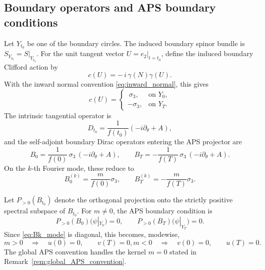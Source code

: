 \documentclass[11pt]{article}
\theoremstyle{definition}
\numberwithin{equation}{section}
\begin{document}
\subsection{Boundary operators and APS boundary conditions}

Let \(Y_{t_0}\) be one of the boundary circles. The induced boundary spinor bundle is \(S_{Y_{t_0}}=S|_{Y_{t_0}}\).
For the unit tangent vector \(U=e_2|_{t=t_0}\), define the induced boundary Clifford action by
\begin{equation}\label{eq:boundary_clifford}
c(U)=-\,i\,\gamma(N)\gamma(U).
\end{equation}
With the inward normal convention \eqref{eq:inward_normal}, this gives
\begin{equation}\label{eq:cU_formula}
c(U)=
\begin{cases}
\ \sigma_3,& \text{on }Y_0,\\
-\sigma_3,& \text{on }Y_T.
\end{cases}
\end{equation}
The intrinsic tangential operator is
\begin{equation}\label{eq:Dt0}
D_{t_0}
=
\frac{1}{f(t_0)}(-i\partial_\theta+A),
\end{equation}
and the self-adjoint boundary Dirac operators entering the APS projector are
\begin{equation}\label{eq:B0BT}
B_0=\frac{1}{f(0)}\,\sigma_3\,(-i\partial_\theta+A),
\qquad
B_T=-\frac{1}{f(T)}\,\sigma_3\,(-i\partial_\theta+A).
\end{equation}
On the \(k\)-th Fourier mode, these reduce to
\begin{equation}\label{eq:Bk_mode}
B_0^{(k)}=\frac{m}{f(0)}\sigma_3,
\qquad
B_T^{(k)}=-\frac{m}{f(T)}\sigma_3.
\end{equation}

Let \(P_{>0}(B_{t_0})\) denote the orthogonal projection onto the strictly positive spectral subspace of \(B_{t_0}\). For \(m\neq 0\), the APS boundary condition is
\begin{equation}\label{eq:APSabstract}
P_{>0}(B_0)\bigl(\psi|_{Y_0}\bigr)=0,
\qquad
P_{>0}(B_T)\bigl(\psi|_{Y_T}\bigr)=0.
\end{equation}
Since \eqref{eq:Bk_mode} is diagonal, this becomes, modewise,
\begin{subequations}
\begin{equation}\label{eq:APS_mpos}
m>0
\quad\Longrightarrow\quad
u(0)=0,
\qquad
v(T)=0,
\end{equation}
\begin{equation}\label{eq:APS_mneg}
m<0
\quad\Longrightarrow\quad
v(0)=0,
\qquad
u(T)=0.
\end{equation}
\end{subequations}
The global APS convention handles the kernel \(m=0\) stated in Remark~\ref{rem:global_APS_convention}.
\end{document}
